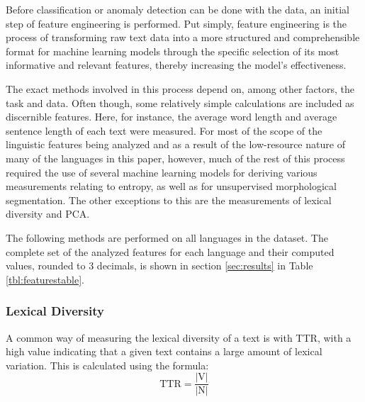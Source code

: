 \documentclass[12pt,a4paper]{article}
\numberwithin{figure}{section}
\numberwithin{table}{section}
\numberwithin{definition}{section}
\begin{document}

Before classification or anomaly detection can be done with the data, an initial step of feature engineering is performed. Put simply, feature engineering is the process of transforming raw text data into a more structured and comprehensible format for machine learning models through the specific selection of its most informative and relevant features, thereby increasing the model's effectiveness. 

The exact methods involved in this process depend on, among other factors, the task and data. Often though, some relatively simple calculations are included as discernible features. Here, for instance, the average word length and average sentence length of each text were measured. For most of the scope of the linguistic features being analyzed and as a result of the low-resource nature of many of the languages in this paper, however, much of the rest of this process required the use of several machine learning models for deriving various measurements relating to entropy, as well as for unsupervised morphological segmentation. The other exceptions to this are the measurements of lexical diversity and PCA.

The following methods are performed on all languages in the dataset. The complete set of the analyzed features for each language and their computed values, rounded to 3 decimals, is shown in section \ref{sec:results} in Table \ref{tbl:featurestable}.

\subsubsection{Lexical Diversity}
\label{ssec:lexicaldiversity}



A common way of measuring the lexical diversity of a text is with TTR, with a high value indicating that a given text contains a large amount of lexical variation. This is calculated using the formula: \[\text{TTR} = \frac{|\text{V}|}{|\text{N}|}\] 
\end{document}
